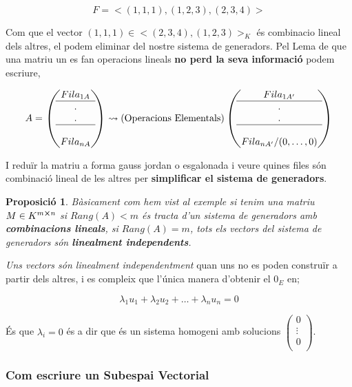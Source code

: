 \documentclass[12pt]{article}
\newtheorem{proposicio}{Proposició}[section]
\begin{document}
\begin{examplebox}{}
    \[F = <(1,1,1), (1,2,3), (2,3,4)>\]

    Com que el vector $(1,1,1) \in <(2,3,4), (1,2,3)>_K$ és combinacio lineal dels altres, el podem eliminar del nostre sistema de generadors. Pel Lema de que una matriu un es fan operacions lineals \textbf{no perd la seva informació} podem escriure,

    \[A =\begin{pmatrix}
Fila_{1A} \\
\hline .\\
. \\
\hline \\
Fila _{nA} 
\end{pmatrix} \rightsquigarrow (\text{Operacions Elementals}) \begin{pmatrix}
Fila_{1A'} \\
\hline .\\
. \\
\hline \\
Fila _{nA'} / (0,\dots,0) 
\end{pmatrix}\]

    I reduïr la matriu a forma gauss jordan o esgalonada i veure quines files són combinació lineal de les altres per \textbf{simplificar el sistema de generadors}.
\end{examplebox}

\begin{proposicio}
    Bàsicament com hem vist al exemple si tenim una matriu $M \in K^{m\cross n}$ si $Rang(A) < m$ és tracta d'un sistema de generadors amb \textbf{combinacions lineals}, si $Rang(A) = m$, tots els vectors del sistema de generadors són \textbf{linealment independents}.
\end{proposicio}

\textit{Uns vectors són linealment independentment} quan uns no es poden construïr a partir dels altres, i es compleix que l'única manera d'obtenir el $0_E$ en;

\[\lambda_1 u_1 + \lambda_2 u_2 + \dots + \lambda_n u_n = 0\]

És que $\lambda_i = 0$ és a dir que és un sistema homogeni amb solucions $\begin{pmatrix}
    0\\
    \vdots\\
    0\\
\end{pmatrix}$. 

\subsubsection{Com escriure un Subespai Vectorial}
\end{document}
